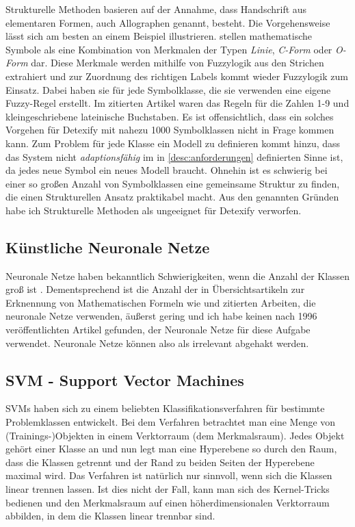 Strukturelle Methoden basieren auf der Annahme, dass Handschrift aus elementaren Formen, auch Allographen genannt, besteht. Die Vorgehensweise lässt sich am besten an einem Beispiel illustrieren. \citet{Fitzgerald:2004p10858} stellen mathematische Symbole als eine Kombination von Merkmalen der Typen \emph{Linie}, \emph{C-Form} oder \emph{O-Form} dar. Diese Merkmale werden mithilfe von Fuzzylogik aus den Strichen extrahiert und zur Zuordnung des richtigen Labels kommt wieder Fuzzylogik zum Einsatz. Dabei haben sie für jede Symbolklasse, die sie verwenden eine eigene Fuzzy-Regel erstellt. Im zitierten Artikel waren das Regeln für die Zahlen 1-9 und kleingeschriebene lateinische Buchstaben. Es ist offensichtlich, dass ein solches Vorgehen für Detexify mit nahezu 1000 Symbolklassen nicht in Frage kommen kann. Zum Problem für jede Klasse ein Modell zu definieren kommt hinzu, dass das System nicht \emph{adaptionsfähig} im in \ref{desc:anforderungen} definierten Sinne ist, da jedes neue Symbol ein neues Modell braucht. Ohnehin ist es schwierig bei einer so großen Anzahl von Symbolklassen eine gemeinsame Struktur zu finden, die einen Strukturellen Ansatz praktikabel macht. Aus den genannten Gründen habe ich Strukturelle Methoden als ungeeignet für Detexify verworfen.

\subsection{Künstliche Neuronale Netze} \label{sub:kuenstliche_neuronale_netze}

Neuronale Netze haben bekanntlich Schwierigkeiten, wenn die Anzahl der Klassen groß ist \cite{Jaeger:2003p1097}. Dementsprechend ist die Anzahl der in Übersichtsartikeln zur Erknennung von Mathematischen Formeln wie \cite{Chan:2000p559} und \cite{Tapia:2007p9160} zitierten Arbeiten, die neuronale Netze verwenden, äußerst gering und ich habe keinen nach 1996 veröffentlichten Artikel gefunden, der Neuronale Netze für diese Aufgabe verwendet. Neuronale Netze können also als irrelevant abgehakt werden.

\subsection[SVM]{SVM - Support Vector Machines} \label{sub:svm}

\ac{SVM}s haben sich zu einem beliebten Klassifikationsverfahren für bestimmte Problemklassen entwickelt. Bei dem Verfahren betrachtet man eine Menge von (Trainings-)Objekten in einem Verktorraum (dem Merkmalsraum). Jedes Objekt gehört einer Klasse an und nun legt man eine Hyperebene so durch den Raum, dass die Klassen getrennt und der Rand zu beiden Seiten der Hyperebene maximal wird. Das Verfahren ist natürlich nur sinnvoll, wenn sich die Klassen linear trennen lassen. Ist dies nicht der Fall, kann man sich des Kernel-Tricks bedienen und den Merkmalsraum auf einen höherdimensionalen Verktorraum abbilden, in dem die Klassen linear trennbar sind.

